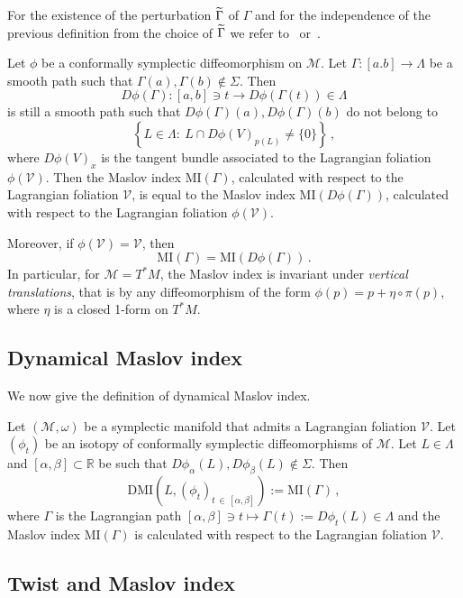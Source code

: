\documentclass[AHL, Unicode, longabstracts, published]{cedram}
\newcommand*\M{\mathcal{M}}
\newcommand*\cv{\mathcal{V}}
\newcommand{\DMI}{\mathrm{DMI}}
\newcommand{\MI}{\mathrm{MI}}
\newcommand*\R{\mathbb{R}}
\let\oldtilde\tilde
\renewcommand*{\tilde}[1]{\mathchoice{\widetilde{#1}}{\widetilde{#1}}{\oldtilde{#1}}{\oldtilde{#1}}}
\begin{document}
For the existence of the perturbation $\tilde\Gamma$ of $\Gamma$ and for the independence of the previous definition from the choice of $\tilde\Gamma$ we refer to~\cite{Arn72} or~\cite{Capleem}.


\begin{rema}\label{rmk invariance diffeo cs}
Let $\phi$ be a conformally symplectic diffeomorphism on $\M$. Let $\Gamma:[a.b]\to\Lambda$ be a smooth path such that $\Gamma(a),\Gamma(b)\notin\Sigma$. Then
\[
D\phi(\Gamma):[a,b]\ni t\to D\phi(\Gamma(t))\in\Lambda
\]
is still a smooth path such that $D\phi(\Gamma)(a),D\phi(\Gamma)(b)$ do not belong to
\[
\left\{ L\in\Lambda :\ L\cap D\phi(V)_{p(L)}\neq\{0\}\right\}\,,
\]
where $D\phi(V)_x$ is the tangent bundle associated to the Lagrangian foliation $\phi(\cv)$. Then the Maslov index $\MI(\Gamma)$, calculated with respect to the Lagrangian foliation $\cv$, is equal to the Maslov index $\MI(D\phi(\Gamma))$, calculated with respect to the Lagrangian foliation $\phi(\cv)$.

Moreover, if $\phi(\cv)=\cv$, then
\[
\MI(\Gamma)=\MI(D\phi(\Gamma))\,.
\]
In particular, for $\M=T^*M$, the Maslov index is invariant under \emph{vertical translations}, that is by any diffeomorphism of the form $\phi(p)=p+\eta\circ\pi(p)$, where $\eta$ is a closed 1-form on $T^*M$.
\end{rema}

\subsection{Dynamical Maslov index}

We now give the definition of dynamical Maslov index.

\begin{defi}
Let $(\M,\omega)$ be a symplectic manifold that admits a Lagrangian foliation $\cv$. Let $(\phi_t) $ be an isotopy of conformally symplectic diffeomorphisms of $\M$. Let $L\in\Lambda$ and $[\alpha,\beta]\subset \R$ be such that $D\phi_\alpha(L),D\phi_\beta(L)\notin\Sigma$. Then
\[
\DMI\left(L,(\phi_t)_{t\,\in\,[\alpha,\beta]}\right):= \MI(\Gamma)\,,
\]
where $\Gamma$ is the Lagrangian path $[\alpha,\beta]\ni t\mapsto \Gamma(t):=D\phi_t(L)\in\Lambda$ and the Maslov index $\MI(\Gamma)$ is calculated with respect to the Lagrangian foliation $\cv$.
\end{defi}



\subsection{Twist and Maslov index}
\end{document}

